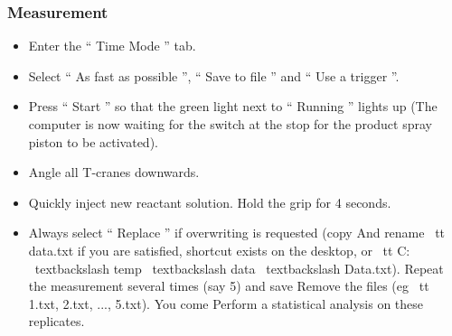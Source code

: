 {\subsubsection{Measurement}
\begin{itemize}
\item Enter the `` Time Mode '' tab.
\item Select `` As fast as possible '', `` Save to file '' and `` Use a trigger ''.
\item Press `` Start '' so that the green light next to `` Running '' lights up
  (The computer is now waiting for the switch at the stop for the product spray piston to be activated).
\item Angle all T-cranes downwards.
\item Quickly inject new reactant solution. Hold the grip for 4 seconds.
\item Always select `` Replace '' if overwriting is requested (copy
  And rename {\ tt data.txt} if you are satisfied, shortcut exists on the desktop, or {\ tt
    C: \ textbackslash temp \ textbackslash data \ textbackslash
    Data.txt}). Repeat the measurement several times (say 5) and save
  Remove the files (eg {\ tt 1.txt, 2.txt, ..., 5.txt}). You come
  Perform a statistical analysis on these replicates.
\end{itemize}
}
